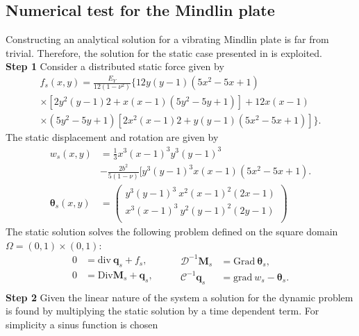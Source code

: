 \subsection{Numerical test for the Mindlin plate}
Constructing an analytical solution for a vibrating Mindlin plate is far from trivial. Therefore, the solution for the static case presented in \cite{mindlinVeiga} is exploited. \\
\textbf{Step 1 } Consider a distributed static force given by 
\begin{equation*}
\begin{aligned}
f_s(x,y)=\frac{E_Y}{12 (1-\nu^2)} \{12 y(y-1)(5x^2-5x+1)\\
\times [2y^2(y-1)2+x(x-1)(5y^2-5y+1)] +12x(x-1)\\
\times (5y^2-5y+1)[2x^2(x-1)2+y(y-1)(5x^2-5x+1)]\}.
\end{aligned}
\end{equation*}
The static displacement and rotation are given by
\begin{align*}
w_s(x,y) &= \frac{1}{3} x^3(x-1)^3 y^3 (y-1)^3\\
&-\frac{2 b^2}{5(1-\nu)}[y^3(y-1)^3 x(x-1)(5 x^2-5x+1). \\
\bm{\theta}_{s}(x,y) &= 
\begin{pmatrix}
y^3(y-1)^3 \ x^2 (x-1)^2 (2x-1) \\
x^3(x-1)^3 \ y^2 (y-1)^2 (2y-1) \\
\end{pmatrix}
\end{align*}
The static solution solves the following problem defined on the square domain $\Omega=(0,1)\times(0,1)$:
\begin{equation}
\begin{aligned}
0 &= \mathrm{div} \ \bm{q}_s + f_s , \\
0 &= \mathrm{Div} \bm{M}_s + \bm{q}_s, \\
\end{aligned} \qquad
\begin{aligned}
\mathcal{D}^{-1} \bm{M}_s &= \mathrm{Grad} \ \bm{\theta}_s, \\
\mathcal{C}^{-1} \bm{q}_s &= \mathrm{grad} \ w_s - \bm{\theta}_s. \\
\end{aligned}
\end{equation}
\textbf{Step 2 } Given the linear nature of the system a solution for the dynamic problem is found by multiplying the static solution by a time dependent term. For simplicity a sinus function is chosen
